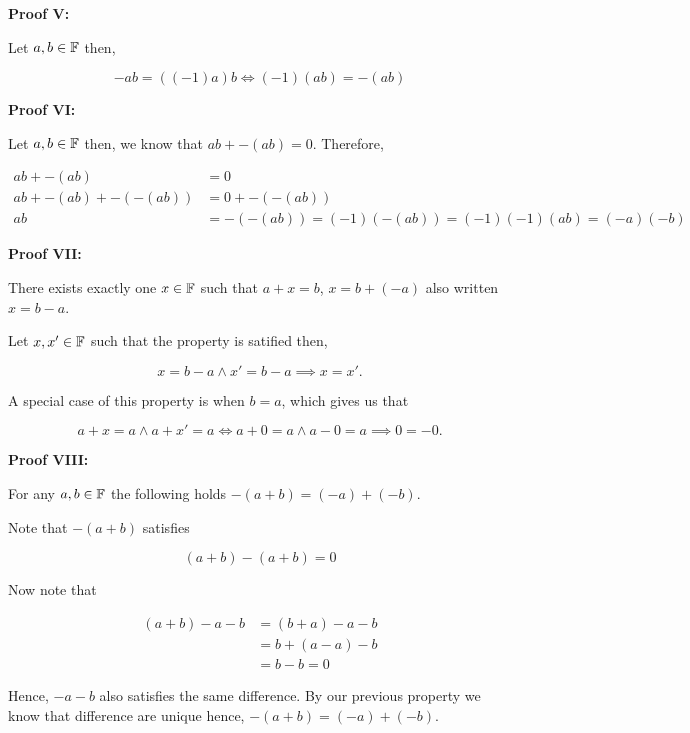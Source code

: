\QED

\textbf{Proof V:}

Let \(a, b \in \mathbb{F}\) then,

\[
	-ab = ((-1)a)b \iff (-1)(ab) = -(ab)
\]

\QED

\textbf{Proof VI:}

Let \(a, b \in \mathbb{F}\) then, we know that \(ab + -(ab) = 0\). Therefore,

\begin{align*}
	ab + -(ab)            & = 0                                                \\
	ab + -(ab) + -(-(ab)) & = 0 + -(-(ab))                                     \\
	ab                    & = -(-(ab)) = (-1)(-(ab)) = (-1)(-1)(ab) = (-a)(-b)
\end{align*}

\QED

\textbf{Proof VII:}

There exists exactly one \(x \in \mathbb{F}\) such that \(a + x = b\), \(x = b + (-a)\) also written
\(x = b - a\).

Let \(x, x' \in \mathbb{F}\) such that the property is satified then,

\[
	x = b - a \land x' = b - a \implies x = x'.
\]

\QED

A special case of this property is when \(b = a\), which gives us that

\[
	a + x = a \land a + x' = a \iff a + 0 = a \land a - 0 = a \implies 0 = -0.
\]

\textbf{Proof VIII:}

For any \(a, b \in \mathbb{F}\) the following holds \(-(a + b)  = (-a) + (-b)\).

Note that \(-(a + b)\) satisfies

\[
	(a + b) - (a + b) = 0
\]

Now note that

\begin{align*}
	(a + b) - a - b & =  (b + a) - a - b \\
	                & = b + (a - a) - b  \\
	                & = b - b = 0
\end{align*}

Hence, \(-a - b\) also satisfies the same difference. By our previous property we know that
difference are unique hence, \(-(a + b) = (-a) + (-b)\).

\QED


